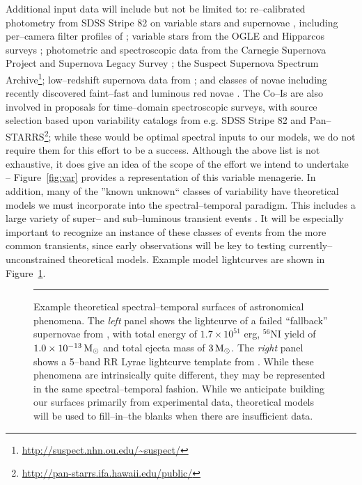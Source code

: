 Additional input data will include but not be limited to: re--calibrated
photometry from SDSS Stripe 82 on variable stars \citep{2010ApJ...708..717S} and
supernovae \citep{2008AJ....136.2306H,2011ApJ...738..162S}, including
per--camera filter profiles of \cite{2007AJ....134..973I}; variable stars from
the OGLE and Hipparcos surveys \citep{2007A&A...475.1159D}; photometric and
spectroscopic data from the Carnegie Supernova Project
\citep[e.g.][]{2010AJ....139..519C} and Supernova Legacy Survey
\citep[e.g.][]{2011yCat..74101262W}; the Suspect Supernova Spectrum
Archive\footnote{\url{http://suspect.nhn.ou.edu/~suspect/}}; low--redshift
supernova data from \cite{2006AJ....131..527J}; and classes of novae including
recently discovered faint--fast \citep{2011ApJ...735...94K} and luminous red
novae \citep{2011ApJ...730..134K}.  The Co--Is are also involved in proposals
for time--domain spectroscopic surveys, with source selection based upon
variability catalogs from e.g. SDSS Stripe 82 and
Pan--STARRS\footnote{\url{http://pan-starrs.ifa.hawaii.edu/public/}}; while
these would be optimal spectral inputs to our models, we do not require them for
this effort to be a success.  Although the above list is not exhaustive, it does
give an idea of the scope of the effort we intend to undertake --
Figure~\ref{fig:var} provides a representation of this variable menagerie. In
addition, many of the ''known unknown`` classes of variability have theoretical
models we must incorporate into the spectral--temporal paradigm.  This includes
a large variety of super-- and sub--luminous transient events
\citep[e.g.][]{2010ApJ...715..767S,2009ApJ...707..193F}.  It will be especially
important to recognize an instance of these classes of events from the more
common transients, since early observations will be key to testing
currently--unconstrained theoretical models.  Example model lightcurves are
shown in Figure~\ref{fig:sts}.

\begin{figure}[t]
\centerline{ \hfil
{}} \smallskip
\caption[]{\footnotesize Example theoretical spectral--temporal surfaces of
astronomical phenomena.  The {\it left} panel shows the lightcurve of a failed
``fallback'' supernovae from \cite{2009ApJ...707..193F}, with total energy of
$1.7 \times 10^{51}$ erg, $^{56}$NI yield of $1.0 \times 10^{-13} {\rm\,M_\odot}$ and
total ejecta mass of $3 {\rm\,M_\odot}$.  The {\it right} panel shows a 5--band RR Lyrae
lightcurve template from \cite{2010ApJ...708..717S}.  While these phenomena are
intrinsically quite different, they may be represented in the same
spectral--temporal fashion.  While we anticipate building our surfaces primarily
from experimental data, theoretical models will be used to fill--in--the blanks
when there are insufficient data.} \medskip \hrule \label{fig:sts} \end{figure}

